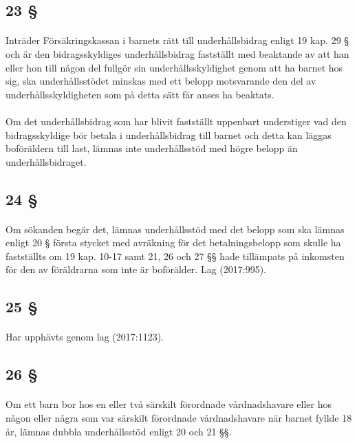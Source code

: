 \documentclass[a4paper,notitlepage,openany,10pt]{book}
\begin{document}
\subsection*{23 §}
\paragraph*{}
Inträder Försäkringskassan i barnets rätt till underhållsbidrag enligt 19 kap. 29 § och är den bidragsskyldiges underhållsbidrag fastställt med beaktande av att han eller hon till någon del fullgör sin underhållsskyldighet genom att ha barnet hos sig, ska underhållsstödet minskas med ett belopp motsvarande den del av underhållsskyldigheten som på detta sätt får anses ha beaktats.
\paragraph*{}
Om det underhållsbidrag som har blivit fastställt uppenbart understiger vad den bidragsskyldige bör betala i underhållsbidrag till barnet och detta kan läggas boföräldern till last, lämnas inte underhållsstöd med högre belopp än underhållsbidraget.
\subsection*{24 §}
\paragraph*{}
Om sökanden begär det, lämnas underhållsstöd med det belopp som ska lämnas enligt 20 § första stycket med avräkning för det betalningsbelopp som skulle ha fastställts om 19 kap. 10-17 samt 21, 26 och 27 §§ hade tillämpats på inkomsten för den av föräldrarna som inte är boförälder.
Lag (2017:995).
\subsection*{25 §}
\paragraph*{}
Har upphävts genom
lag (2017:1123).
\subsection*{26 §}
\paragraph*{}
Om ett barn bor hos en eller två särskilt förordnade vårdnadshavare eller hos någon eller några som var särskilt förordnade vårdnadshavare när barnet fyllde 18 år, lämnas dubbla underhållsstöd enligt 20 och 21 §§.
\end{document}
